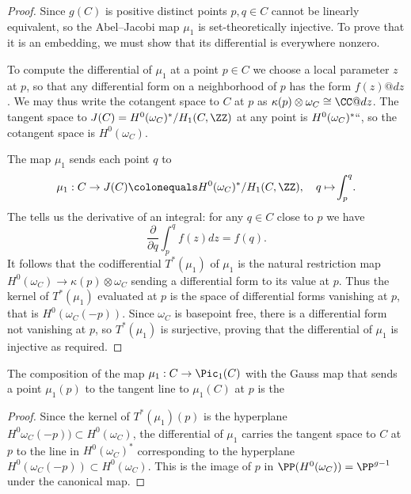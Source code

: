 \begin{proof}
Since $g(C)$
is positive
distinct points $p, q \in C$ cannot be linearly equivalent, so the
Abel--Jacobi map $\mu_1$ is set-theoretically
injective. To prove that it is an embedding, we must show
that its differential is
everywhere nonzero.

To compute the differential of $\mu_1$ at a point $p\in C$ we choose a
local parameter $z$ at $p$, so that any differential form on a
neighborhood of $p$ has the form $f(z)@dz$. We may thus write the
cotangent space to $C$ at $p$ as
$\kappa(p) \otimes \omega_{C} \cong \CC@dz$. The tangent space to
$J(C) = H^0(\omega_C)^*/H_1(C, \ZZ)$ at any point is
$H^0(\omega_C)^*` `$, so the 
%
cotangent space
is $H^0(\omega_C)$.

The map $\mu_{1}$ sends each point $q$ to
\vspace*{-2pt}
$$
\mu_1 : C \to J(C) \colonequals H^0(\omega_C)^*/H_1(C, \ZZ),  
\quad q \mapsto \!\int_p^q \!.
\vspace*{-2pt}
$$
The 
%
tells us the derivative of an integral: 
for any $q\in C$ close to $p$ we have
$$
\frac{\partial}{\partial q} \int_p^q \!f(z)dz = f(q).
$$
It follows that
the 
%
codifferential 
$T^*(\mu_1)$ of $\mu_1$ is the natural restriction map $H^0(\omega_{C}) \to \kappa(p) \otimes \omega_{C}$ sending
a differential form to its value at $p$. Thus the kernel of $T^*(\mu_1)$ evaluated at $p$ is the space of differential forms vanishing
at $p$, that is
$H^{0}(\omega_{C}(-p))$. Since $\omega_{C}$ is basepoint free, there is a differential form not vanishing at $p$,
so  $T^*(\mu_1)$ is surjective, proving that
the differential of $\mu_{1}$ is injective as required.
\end{proof}

\begin{corollary}
The composition of the map $\mu_{1}: C \to \Pic_{1}(C)$ with the 
Gauss map 
%
that sends a point $\mu_{1}(p)$
to the tangent line to $\mu_{1}(C)$ at $p$ is the 
%
\unif
\end{corollary}

\begin{proof}
Since 
the kernel of $T^*(\mu_1)(p)$ is  the hyperplane $H^{0}\omega_{C}(-p))\subset H^{0}(\omega_{C})$, the differential 
of $\mu_{1}$ carries the tangent space to $C$ at $p$ to the line
in $H^0(\omega_C)^*$ corresponding to the hyperplane $H^0(\omega_C(-p))\subset H^0(\omega_C)$.
This is the image of $p$ in $\PP(H^{0}(\omega_{C})) = \PP^{g-1}$ under the
canonical map.
\end{proof}


